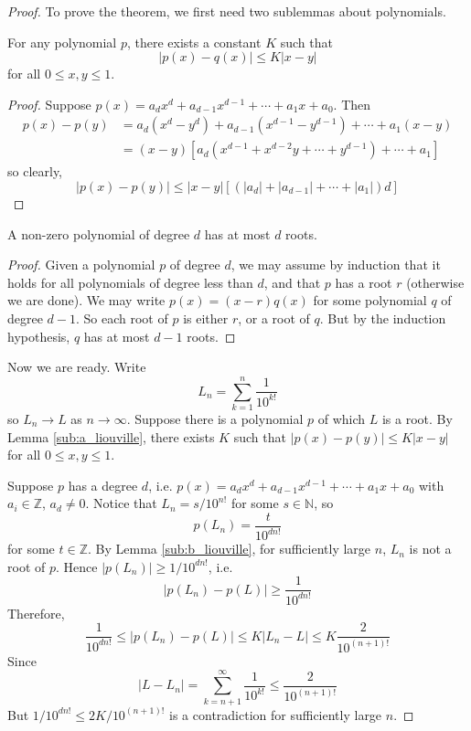 \documentclass[10pt, a4paper, twoside]{report}
\begin{document}
\begin{proof}
    To prove the theorem, we first need two sublemmas about polynomials.
\begin{lemma}
    For any polynomial \(p\), there exists a constant \(K\) such that 
    \[|p(x)-q(x)|\leq K|x-y|\]
    for all \(0\leq x,y\leq 1\).
    \label{sub:a_liouville}
\end{lemma}
\begin{proof}
    Suppose \(p(x)=a_dx^d+a_{d-1}x^{d-1}+\cdots+a_1x+a_0\).
    Then
    \begin{align*}
        p(x)-p(y)&=a_d(x^d-y^d)+a_{d-1}(x^{d-1}-y^{d-1})+\cdots+a_1(x-y) \\
        &=(x-y)\left[a_d(x^{d-1}+x^{d-2}y+\cdots+y^{d-1})+\cdots+a_1\right]
    \end{align*}
    so clearly,
    \[|p(x)-p(y)|\leq|x-y|\left[(|a_d|+|a_{d-1}|+\cdots+|a_1|)d\right]\]
\end{proof}
\begin{lemma}
    A non-zero polynomial of degree \(d\) has at most \(d\) roots.
    \label{sub:b_liouville}
\end{lemma}
\begin{proof}
    Given a polynomial \(p\) of degree \(d\), we may assume by induction that it holds for all polynomials of degree less than \(d\), and that \(p\) has a root \(r\) (otherwise we are done). We may write \(p(x)=(x-r)q(x)\) for some polynomial \(q\) of degree \(d-1\). So each root of \(p\) is either \(r\), or a root of \(q\). But by the induction hypothesis, \(q\) has at most \(d-1\) roots.
\end{proof}
    Now we are ready.
    Write
    \[L_n=\sum_{k=1}^{n}\frac{1}{10^{k!}}\]
    so \(L_n\to L\) as \(n\to\infty\). Suppose there is a polynomial \(p\) of which \(L\) is a root. By Lemma \ref{sub:a_liouville}, there exists \(K\) such that \(|p(x)-p(y)|\leq K|x-y|\) for all \(0\leq x,y\leq 1\).

    Suppose \(p\) has a degree \(d\), i.e. \(p(x)=a_dx^d+a_{d-1}x^{d-1}+\cdots+a_1x+a_0\) with \(a_i\in\mathbb{Z}\), \(a_d\neq 0\). Notice that \(L_n=s/10^{n!}\) for some \(s\in\mathbb{N}\), so
    \[p(L_n)=\frac{t}{10^{dn!}}\]
    for some \(t\in\mathbb{Z}\). By Lemma \ref{sub:b_liouville}, for sufficiently large \(n\), \(L_n\) is not a root of \(p\). Hence \(|p(L_n)|\geq 1/10^{dn!}\), i.e. 
    \[|p(L_n)-p(L)|\geq\frac{1}{10^{dn!}}\]
    Therefore, 
    \[\frac{1}{10^{dn!}}\leq|p(L_n)-p(L)|\leq K|L_n-L|\leq K\frac{2}{10^{(n+1)!}}\]
    Since 
    \[|L-L_n|=\sum_{k=n+1}^{\infty}\frac 1{10^{k!}}\leq\frac{2}{10^{(n+1)!}}\]
    But \(1/10^{dn!}\leq 2K/10^{(n+1)!}\) is a contradiction for sufficiently large \(n\).
\end{proof}
\end{document}
